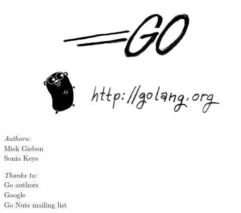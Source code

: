 \documentclass[a4paper,twoside]{blocksbook}
\begin{document}
\thispagestyle{empty}

\begin{figure}[t!]
\begin{center}
    \includegraphics[scale=0.65]{fig/bumper-inverse.png}
    {}
\end{center}
\end{figure}
\vspace*{5.0cm}
\begin{minipage}{0.4\textwidth}
\begin{flushleft} \large
\hspace*{2,0cm}\emph{Authors:}\\
\hspace*{2.0cm}Miek Gieben\\
\hspace*{2.0cm}Sonia Keys\\
\vfill
\end{flushleft}
\end{minipage}
%
\begin{minipage}{0.4\textwidth}
\begin{flushright} \large
\emph{Thanks to:} \\
Go authors\\
Google\\
Go Nuts mailing list
\vfill
\end{flushright}
\end{minipage}

\vfill
\begin{center}
    \hspace*{1cm}\\[2.5ex]
    \hspace*{1cm}{\tiny\CcNote{\CcLongnameByNcSa}}
\newline\hspace*{1cm}{\tiny Build: \today}
\end{center}
\end{document}
